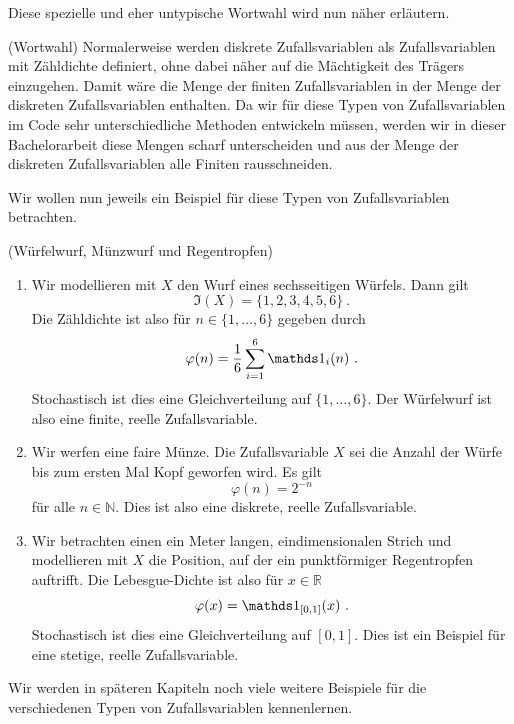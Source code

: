 Diese spezielle und eher untypische Wortwahl wird nun näher erläutern.

\begin{Bemerkung}{(Wortwahl)}
Normalerweise werden diskrete Zufallsvariablen als Zufallsvariablen mit Zähldichte definiert, ohne dabei näher auf die Mächtigkeit des Trägers einzugehen. Damit wäre die Menge der finiten Zufallsvariablen in der Menge der diskreten Zufallsvariablen enthalten. Da wir für diese Typen von Zufallsvariablen im Code sehr unterschiedliche Methoden entwickeln müssen, werden wir in dieser Bachelorarbeit diese Mengen scharf unterscheiden und aus der Menge der diskreten Zufallsvariablen alle Finiten rausschneiden.
\end{Bemerkung}

Wir wollen nun jeweils ein Beispiel für diese Typen von Zufallsvariablen betrachten.

\begin{Beispiel}{(Würfelwurf, Münzwurf und Regentropfen)}
\begin{enumerate}[label=(\roman*)]
\item \hypertarget{Bsp:Würfel}{}Wir modellieren mit $X$ den Wurf eines sechsseitigen Würfels. Dann gilt
\[\Im(X) = \{1, 2, 3, 4, 5, 6\}~.\]
Die Zähldichte ist also für $n \in \{1, \dots, 6\}$ gegeben durch
\[\varphi(n) = \frac{1}{6} \sum_{i = 1}^6 \indi_{i}(n)~.\]
Stochastisch ist dies eine Gleichverteilung auf $\{1, \dots, 6\}$. Der Würfelwurf ist also eine finite, reelle Zufallsvariable.

\item \hypertarget{Bsp:Münze}{}Wir werfen eine faire Münze. Die Zufallsvariable $X$ sei die Anzahl der Würfe bis zum ersten Mal Kopf geworfen wird. Es gilt
\[\varphi(n) = 2^{-n}\]
für alle $n \in \mathbb{N}$. Dies ist also eine diskrete, reelle Zufallsvariable.

\item \hypertarget{Bsp:Regen}{}Wir betrachten einen ein Meter langen, eindimensionalen Strich und modellieren mit $X$ die Position, auf der ein punktförmiger Regentropfen auftrifft. Die Lebesgue-Dichte ist also für $x \in \mathbb{R}$
\[\varphi(x) = \indi_{[0, 1]}(x)~.\]
Stochastisch ist dies eine Gleichverteilung auf $[0, 1]$. Dies ist ein Beispiel für eine stetige, reelle Zufallsvariable.
\end{enumerate}
Wir werden in späteren Kapiteln noch viele weitere Beispiele für die verschiedenen Typen von Zufallsvariablen kennenlernen.
\end{Beispiel}

